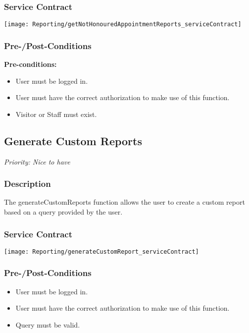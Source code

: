 \subsubsection{Service Contract}
\texttt{[image: Reporting/getNotHonouredAppointmentReports\_serviceContract]}
\subsubsection{Pre-/Post-Conditions}
	\textbf{Pre-conditions:}
	\begin{itemize}
		\item User must be logged in.
		\item User must have the correct authorization to make use of this function.
		\item Visitor or Staff must exist.
	\end{itemize}

\subsection{Generate Custom Reports}
\textit{Priority: \textcolor{myGreen}{Nice to have}}

\subsubsection{Description}
The generateCustomReports function allows the user to create a custom report based on a query provided by the user.

\subsubsection{Service Contract}
\texttt{[image: Reporting/generateCustomReport\_serviceContract]}

\subsubsection{Pre-/Post-Conditions}
	\begin{itemize}
		\item User must be logged in.
		\item User must have the correct authorization to make use of this function.
		\item Query must be valid.
	\end{itemize}



